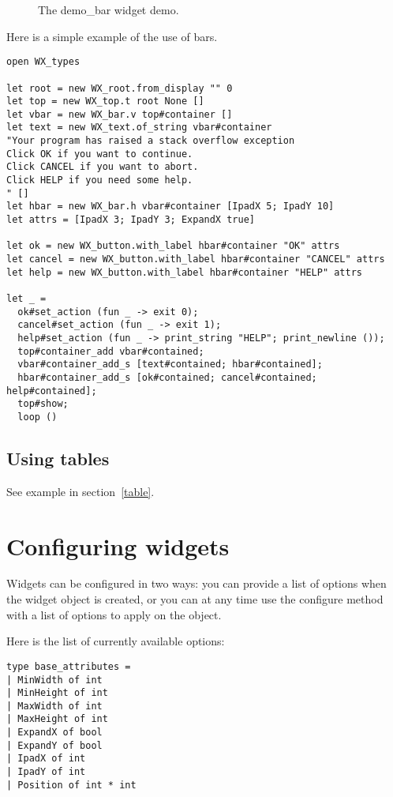 \documentclass{report}
\newcommand{\psfigure}[3]{ %
  \begin{quote}\let\normalsize\small\caption{#3\label{fig:#2}}\end{quote}
  }
\begin{document}
\begin{figure}[t]
\begin{center}
\psfigure{0.3}{bar}{The demo\_bar widget demo.}
\end{center}
\end{figure}

Here is a simple example of the use of bars.
\begin{verbatim}
open WX_types

let root = new WX_root.from_display "" 0
let top = new WX_top.t root None []
let vbar = new WX_bar.v top#container []
let text = new WX_text.of_string vbar#container 
"Your program has raised a stack overflow exception
Click OK if you want to continue.
Click CANCEL if you want to abort.
Click HELP if you need some help.
" []
let hbar = new WX_bar.h vbar#container [IpadX 5; IpadY 10]
let attrs = [IpadX 3; IpadY 3; ExpandX true]

let ok = new WX_button.with_label hbar#container "OK" attrs
let cancel = new WX_button.with_label hbar#container "CANCEL" attrs
let help = new WX_button.with_label hbar#container "HELP" attrs

let _ =
  ok#set_action (fun _ -> exit 0);
  cancel#set_action (fun _ -> exit 1);
  help#set_action (fun _ -> print_string "HELP"; print_newline ());
  top#container_add vbar#contained;
  vbar#container_add_s [text#contained; hbar#contained];
  hbar#container_add_s [ok#contained; cancel#contained; help#contained];
  top#show;
  loop ()
\end{verbatim}

\subsection{Using tables}

See example in section~\ref{table}.

\section{Configuring widgets}
\label{configuration}

  Widgets can be configured in two ways: you can provide a list of options 
when the widget object is created, or you can at any time use the {\sf 
configure} method with a list of options to apply on the object.

Here is the list of currently available options:

\begin{verbatim}
type base_attributes =
| MinWidth of int
| MinHeight of int
| MaxWidth of int
| MaxHeight of int
| ExpandX of bool
| ExpandY of bool
| IpadX of int
| IpadY of int
| Position of int * int
\end{verbatim}
\end{document}
